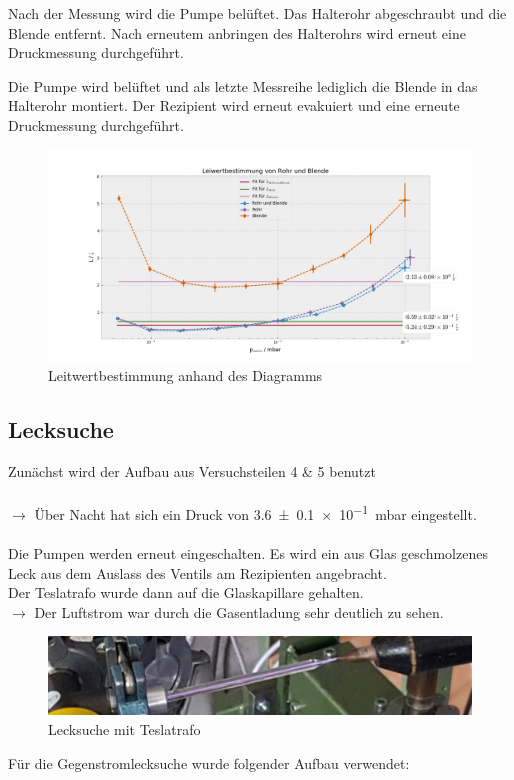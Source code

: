 \documentclass[12pt, a4paper]{scrartcl}
\begin{document}
    	
   	
   		Nach der Messung wird die Pumpe belüftet. Das Halterohr abgeschraubt und die Blende entfernt. Nach erneutem anbringen des Halterohrs wird erneut eine Druckmessung durchgeführt.
   	
   		Die Pumpe wird belüftet und als letzte Messreihe lediglich die Blende in das Halterohr montiert. Der Rezipient wird erneut evakuiert und eine erneute Druckmessung durchgeführt.
   	
   		   
   	
  		
   		\begin{landscape}
   			\begin{figure}[h!]
   				\hspace*{-40mm}\includegraphics[width=1.8\textwidth]{../25-f1.png}
   				\caption{Leitwertbestimmung anhand des Diagramms}
                \label{diagram:leitwert}
   			\end{figure}
   		\end{landscape}
   		
    
    
    \subsection{Lecksuche}
    
		Zunächst wird der Aufbau aus Versuchsteilen 4 \& 5 benutzt\\\\	
		$\rightarrow$ Über Nacht hat sich ein Druck von 
        \SI{3.6+-0.1 e-1}{mbar}
        eingestellt.\\\\
		Die Pumpen werden erneut eingeschalten. Es wird ein aus Glas geschmolzenes Leck aus dem Auslass des Ventils am Rezipienten angebracht.\\
		Der Teslatrafo wurde dann auf die Glaskapillare gehalten.\\
		$\rightarrow$ Der Luftstrom war durch die Gasentladung sehr deutlich zu sehen.
        \begin{figure}[H]
            \centering
            \includegraphics[width=.6\paperwidth]{foto2}
            \caption{Lecksuche mit Teslatrafo}
        \end{figure}	
		Für die Gegenstromlecksuche wurde folgender Aufbau verwendet:
		
\end{document}
